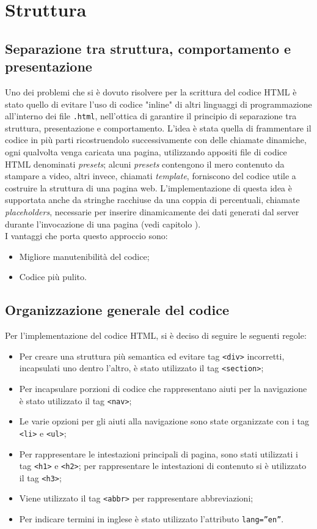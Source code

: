 \section{Struttura}
    \subsection{Separazione tra struttura, comportamento e presentazione}
    Uno dei problemi che si è dovuto risolvere per la scrittura del codice HTML è stato quello di evitare l'uso di codice "inline" di altri linguaggi di programmazione all'interno dei file \texttt{.html}, nell'ottica di  garantire il principio di separazione tra struttura, presentazione e comportamento. L'idea è stata quella di frammentare il codice in più parti ricostruendolo successivamente con delle chiamate dinamiche, ogni qualvolta venga caricata una pagina, utilizzando appositi file di codice HTML denominati \textit{presets}; alcuni \textit{presets} contengono il mero contenuto da stampare a video, altri invece, chiamati \textit{template}, forniscono del codice utile a costruire la struttura di una pagina web. L'implementazione di questa idea è supportata anche da stringhe racchiuse da una coppia di percentuali, chiamate \textit{placeholders}, necessarie per inserire dinamicamente dei dati generati dal server durante l'invocazione di una pagina (vedi capitolo ).\\ I vantaggi che porta questo approccio sono:
    \begin{itemize}
        \item Migliore manutenibilità del codice;
        \item Codice più pulito.
    \end{itemize}
    
    \subsection{Organizzazione generale del codice}
    Per l'implementazione del codice HTML, si è deciso di seguire le seguenti regole:
    \begin{itemize}
        \item Per creare una struttura più semantica ed evitare tag \texttt{<div>} incorretti, incapsulati uno dentro l'altro, è stato utilizzato il tag \texttt{<section>};
        \item Per incapsulare porzioni di codice che rappresentano aiuti per la navigazione è stato utilizzato il tag \texttt{<nav>};
        \item Le varie opzioni per gli aiuti alla navigazione sono state organizzate con i tag \texttt{<li>} e \texttt{<ul>};
        \item Per rappresentare le intestazioni principali di pagina, sono stati utilizzati i tag \texttt{<h1>} e \texttt{<h2>}; per rappresentare le intestazioni di contenuto si è utilizzato il tag \texttt{<h3>};
        \item Viene utilizzato il tag \texttt{<abbr>} per rappresentare abbreviazioni;
        \item Per indicare termini in inglese è stato utilizzato l'attributo \texttt{lang=”en”}.
    \end{itemize}
    
